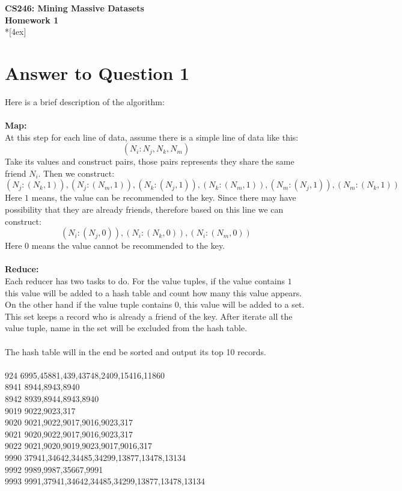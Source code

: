 \documentclass[11pt]{article}
\begin{document}
\thispagestyle{empty}
\parindent 0pt
\vfill
\large

\begin{center}
\LARGE{\bf \textsf{CS246: Mining Massive Datasets}}\\ {\bf \textsf{Homework 1}}
\\*[4ex]
\end{center}

\section*{Answer to Question 1}
Here is a brief description of the algorithm:\\
\\
\textbf{Map:}\\
At this step for each line of data, assume there is a simple line of data like this:
$$
    (N_{i}: N_{j}, N_{k}, N_{m})
$$
Take its values and construct pairs, those pairs represents they share the same friend $N_i$. Then we construct:
$$
 (N_j: (N_k, 1)), (N_j: (N_m, 1)), (N_k: (N_j, 1)), (N_k: (N_m, 1)), (N_m: (N_j, 1)), (N_m: (N_k, 1))
$$
Here $1$ means, the value can be recommended to the key. Since there may have possibility that they are already friends,
therefore based on this line we can construct:
$$
 (N_i:(N_j, 0)), (N_i:(N_k, 0)), (N_i:(N_m, 0))
$$
Here $0$ means the value cannot be recommended to the key.\\
\\
\textbf{Reduce:}\\
Each reducer has two tasks to do. For the value tuples,
if the value contains $1$ this value will be added to a hash table and count how many this value appears.
On the other hand if the value tuple contains $0$, this value will be added to a set.
This set keeps a record who is already a friend of the key.
After iterate all the value tuple, name in the set will be excluded from the hash table.\\
\\
The hash table will in the end be sorted and output its top 10 records.\\
\\
924	6995,45881,439,43748,2409,15416,11860\\
8941 8944,8943,8940\\
8942 8939,8944,8943,8940\\
9019	9022,9023,317\\
9020	9021,9022,9017,9016,9023,317\\
9021	9020,9022,9017,9016,9023,317\\
9022	9021,9020,9019,9023,9017,9016,317\\
9990	37941,34642,34485,34299,13877,13478,13134\\
9992	9989,9987,35667,9991\\
9993	9991,37941,34642,34485,34299,13877,13478,13134\\
\end{document}

